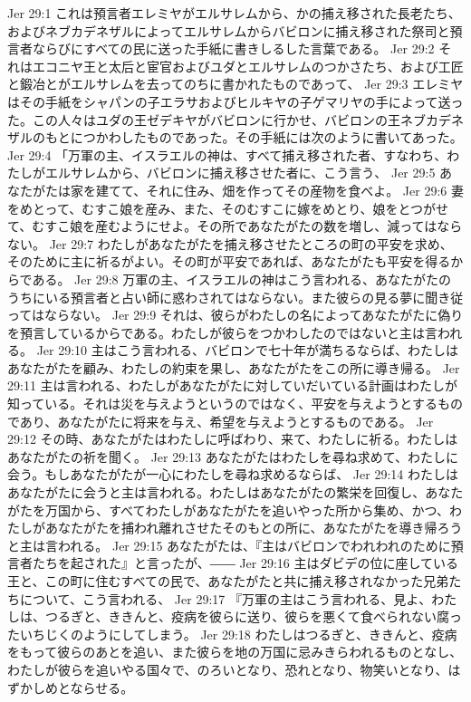 Jer 29:1  これは預言者エレミヤがエルサレムから、かの捕え移された長老たち、およびネブカデネザルによってエルサレムからバビロンに捕え移された祭司と預言者ならびにすべての民に送った手紙に書きしるした言葉である。
Jer 29:2  それはエコニヤ王と太后と宦官およびユダとエルサレムのつかさたち、および工匠と鍛冶とがエルサレムを去ってのちに書かれたものであって、
Jer 29:3  エレミヤはその手紙をシャパンの子エラサおよびヒルキヤの子ゲマリヤの手によって送った。この人々はユダの王ゼデキヤがバビロンに行かせ、バビロンの王ネブカデネザルのもとにつかわしたものであった。その手紙には次のように書いてあった。
Jer 29:4  「万軍の主、イスラエルの神は、すべて捕え移された者、すなわち、わたしがエルサレムから、バビロンに捕え移させた者に、こう言う、
Jer 29:5  あなたがたは家を建てて、それに住み、畑を作ってその産物を食べよ。
Jer 29:6  妻をめとって、むすこ娘を産み、また、そのむすこに嫁をめとり、娘をとつがせて、むすこ娘を産むようにせよ。その所であなたがたの数を増し、減ってはならない。
Jer 29:7  わたしがあなたがたを捕え移させたところの町の平安を求め、そのために主に祈るがよい。その町が平安であれば、あなたがたも平安を得るからである。
Jer 29:8  万軍の主、イスラエルの神はこう言われる、あなたがたのうちにいる預言者と占い師に惑わされてはならない。また彼らの見る夢に聞き従ってはならない。
Jer 29:9  それは、彼らがわたしの名によってあなたがたに偽りを預言しているからである。わたしが彼らをつかわしたのではないと主は言われる。
Jer 29:10  主はこう言われる、バビロンで七十年が満ちるならば、わたしはあなたがたを顧み、わたしの約束を果し、あなたがたをこの所に導き帰る。
Jer 29:11  主は言われる、わたしがあなたがたに対していだいている計画はわたしが知っている。それは災を与えようというのではなく、平安を与えようとするものであり、あなたがたに将来を与え、希望を与えようとするものである。
Jer 29:12  その時、あなたがたはわたしに呼ばわり、来て、わたしに祈る。わたしはあなたがたの祈を聞く。
Jer 29:13  あなたがたはわたしを尋ね求めて、わたしに会う。もしあなたがたが一心にわたしを尋ね求めるならば、
Jer 29:14  わたしはあなたがたに会うと主は言われる。わたしはあなたがたの繁栄を回復し、あなたがたを万国から、すべてわたしがあなたがたを追いやった所から集め、かつ、わたしがあなたがたを捕われ離れさせたそのもとの所に、あなたがたを導き帰ろうと主は言われる。
Jer 29:15  あなたがたは、『主はバビロンでわれわれのために預言者たちを起された』と言ったが、――
Jer 29:16  主はダビデの位に座している王と、この町に住むすべての民で、あなたがたと共に捕え移されなかった兄弟たちについて、こう言われる、
Jer 29:17  『万軍の主はこう言われる、見よ、わたしは、つるぎと、ききんと、疫病を彼らに送り、彼らを悪くて食べられない腐ったいちじくのようにしてしまう。
Jer 29:18  わたしはつるぎと、ききんと、疫病をもって彼らのあとを追い、また彼らを地の万国に忌みきらわれるものとなし、わたしが彼らを追いやる国々で、のろいとなり、恐れとなり、物笑いとなり、はずかしめとならせる。
